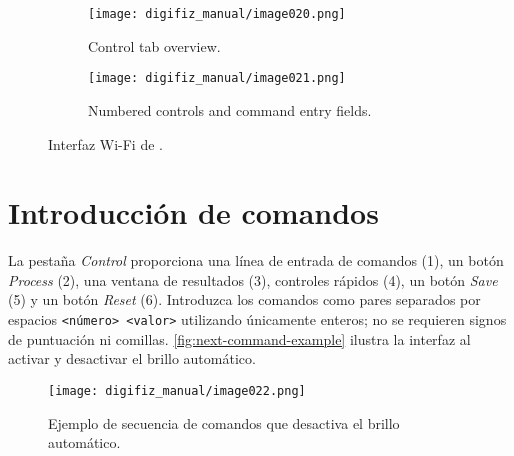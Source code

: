 \begin{figure}[htbp]
    \centering
    \begin{subfigure}{0.48\textwidth}
        \texttt{[image: digifiz\_manual/image020.png]}
        \caption{Control tab overview.}
    \end{subfigure}\hfill
    \begin{subfigure}{0.48\textwidth}
        \texttt{[image: digifiz\_manual/image021.png]}
        \caption{Numbered controls and command entry fields.}
    \end{subfigure}
    \caption{Interfaz Wi-Fi de \ReplicaNextShort{}.}
    \label{fig:next-control-tabs}
\end{figure}

\section{Introducción de comandos}
La pestaña \emph{Control} proporciona una línea de entrada de comandos (1), un botón \emph{Process} (2), una ventana de resultados (3), controles rápidos (4), un botón \emph{Save} (5) y un botón \emph{Reset} (6). Introduzca los comandos como pares separados por espacios \verb|<número> <valor>| utilizando únicamente enteros; no se requieren signos de puntuación ni comillas. \autoref{fig:next-command-example} ilustra la interfaz al activar y desactivar el brillo automático.

\begin{figure}[htbp]
    \centering
    \texttt{[image: digifiz\_manual/image022.png]}
\caption{Ejemplo de secuencia de comandos que desactiva el brillo automático.}
    \label{fig:next-command-example}
\end{figure}

